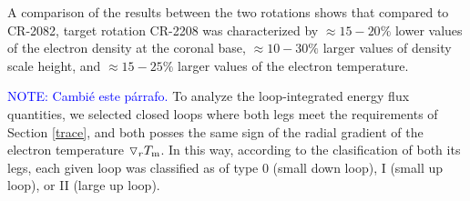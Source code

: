 \documentclass[namedreferences]{solarphysics}
\newcommand{\dr}{\triangledown_r}
\newcommand{\Tm}{T_{\rm m}}
\def\diego#1{\textcolor{red}{#1}}
\def\notebyalbert#1{\textcolor{blue}{NOTE: #1}}
\begin{document}
\begin{article}
{A comparison of the results between the two rotations shows that compared to CR-2082, target rotation CR-2208 was characterized by $\approx 15-20\%$ lower values of the electron density at the coronal base, $\approx 10-30\%$ larger values of density scale height, and $\approx 15-25\%$ larger values of the electron temperature.}



\notebyalbert{Cambié este párrafo.} {To analyze the loop-integrated energy flux quantities, we selected closed loops where both legs meet the requirements of Section \ref{trace}, and both posses the same sign of the radial gradient of the electron temperature $\dr\Tm$. In this way, according to the clasification of both its legs, each given loop was classified as of type 0 (small down loop), I (small up loop), or II (large up loop).}



\end{article}
\end{document}
